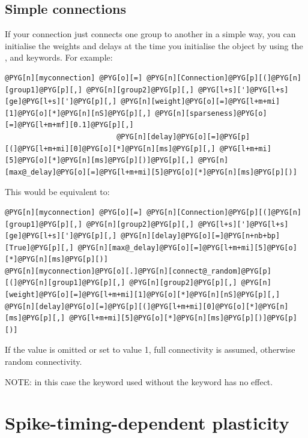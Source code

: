 \documentclass[letterpaper,10pt,english]{manual}
\begin{document}
\subsection{Simple connections}

If your connection just connects one group to another in a simple way, you can initialise
the weights and delays at the time you initialise the \hyperlink{brian.Connection}{} object by using
the ,  and  keywords. For example:

\begin{Verbatim}[commandchars=@\[\]]
@PYG[n][myconnection] @PYG[o][=] @PYG[n][Connection]@PYG[p][(]@PYG[n][group1]@PYG[p][,] @PYG[n][group2]@PYG[p][,] @PYG[l+s][']@PYG[l+s][ge]@PYG[l+s][']@PYG[p][,] @PYG[n][weight]@PYG[o][=]@PYG[l+m+mi][1]@PYG[o][*]@PYG[n][nS]@PYG[p][,] @PYG[n][sparseness]@PYG[o][=]@PYG[l+m+mf][0.1]@PYG[p][,]
                          @PYG[n][delay]@PYG[o][=]@PYG[p][(]@PYG[l+m+mi][0]@PYG[o][*]@PYG[n][ms]@PYG[p][,] @PYG[l+m+mi][5]@PYG[o][*]@PYG[n][ms]@PYG[p][)]@PYG[p][,] @PYG[n][max@_delay]@PYG[o][=]@PYG[l+m+mi][5]@PYG[o][*]@PYG[n][ms]@PYG[p][)]
\end{Verbatim}

This would be equivalent to:

\begin{Verbatim}[commandchars=@\[\]]
@PYG[n][myconnection] @PYG[o][=] @PYG[n][Connection]@PYG[p][(]@PYG[n][group1]@PYG[p][,] @PYG[n][group2]@PYG[p][,] @PYG[l+s][']@PYG[l+s][ge]@PYG[l+s][']@PYG[p][,] @PYG[n][delay]@PYG[o][=]@PYG[n+nb+bp][True]@PYG[p][,] @PYG[n][max@_delay]@PYG[o][=]@PYG[l+m+mi][5]@PYG[o][*]@PYG[n][ms]@PYG[p][)]
@PYG[n][myconnection]@PYG[o][.]@PYG[n][connect@_random]@PYG[p][(]@PYG[n][group1]@PYG[p][,] @PYG[n][group2]@PYG[p][,] @PYG[n][weight]@PYG[o][=]@PYG[l+m+mi][1]@PYG[o][*]@PYG[n][nS]@PYG[p][,] @PYG[n][delay]@PYG[o][=]@PYG[p][(]@PYG[l+m+mi][0]@PYG[o][*]@PYG[n][ms]@PYG[p][,] @PYG[l+m+mi][5]@PYG[o][*]@PYG[n][ms]@PYG[p][)]@PYG[p][)]
\end{Verbatim}

If the  value is omitted or set to value 1, full connectivity is assumed,
otherwise random connectivity.

NOTE: in this case the  keyword used without the  keyword has no effect.

\resetcurrentobjects
\hypertarget{--doc-stdp}{}

\section{Spike-timing-dependent plasticity}
\end{document}
